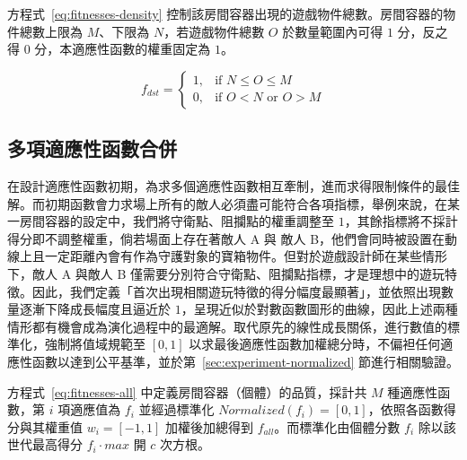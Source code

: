 方程式~\ref{eq:fitnesses-density} 控制該房間容器出現的遊戲物件總數。房間容器的物件總數上限為 $M$、下限為 $N$，若遊戲物件總數 $O$ 於數量範圍內可得 $1$ 分，反之得 $0$ 分，本適應性函數的權重固定為 $1$。

\begin{equation}
    \label{eq:fitnesses-density}
    f_{dst} = \begin{cases}
                  1, & \mbox{if } N \leq O \leq M \\
                  0, & \mbox{if } O<N \text{ or } O>M
              \end{cases}
\end{equation}



\subsection{多項適應性函數合併}
\label{ssec:method-segments-multiobjectives}

在設計適應性函數初期，為求多個適應性函數相互牽制，進而求得限制條件的最佳解。而初期函數會力求場上所有的敵人必須盡可能符合各項指標，舉例來說，在某一房間容器的設定中，我們將守衛點、阻攔點的權重調整至 $1$，其餘指標將不採計得分即不調整權重，倘若場面上存在著敵人 A 與 敵人 B，他們會同時被設置在動線上且一定距離內會有作為守護對象的寶箱物件。但對於遊戲設計師在某些情形下，敵人 A 與敵人 B 僅需要分別符合守衛點、阻攔點指標，才是理想中的遊玩特徵。因此，我們定義「首次出現相關遊玩特徵的得分幅度最顯著」，並依照出現數量逐漸下降成長幅度且逼近於 $1$，呈現近似於對數函數圖形的曲線，因此上述兩種情形都有機會成為演化過程中的最適解。取代原先的線性成長關係，進行數值的標準化，強制將值域規範至 $[0, 1]$ 以求最後適應性函數加權總分時，不偏袒任何適應性函數以達到公平基準，並於第~\ref{sec:experiment-normalized} 節進行相關驗證。

方程式~\ref{eq:fitnesses-all} 中定義房間容器（個體）的品質，採計共 $M$ 種適應性函數，第 $i$ 項適應值為 $f_{i}$ 並經過標準化 $Normalized(f_{i}) = [0, 1]$，依照各函數得分與其權重值 $w_{i} = [-1, 1]$ 加權後加總得到 $f_{all}$。而標準化由個體分數 $f_{i}$ 除以該世代最高得分 $f_{i}\cdot max$ 開 $c$ 次方根。

